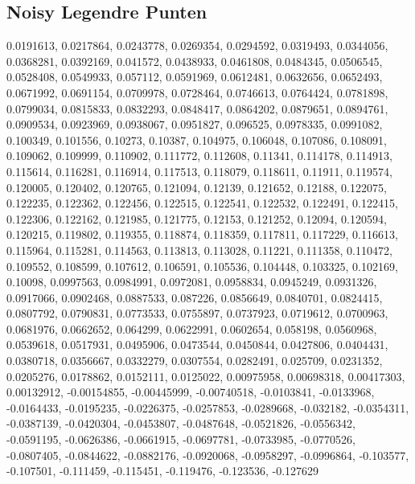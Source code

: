 \documentclass[10pt,a4paper,twocolumn]{article}
\begin{document}
\subsection{Noisy Legendre Punten}
0.0191613, 0.0217864, 0.0243778, 0.0269354, 0.0294592, 0.0319493, 0.0344056, 0.0368281, 0.0392169, 0.041572, 0.0438933, 0.0461808, 0.0484345, 0.0506545, 0.0528408, 0.0549933, 0.057112, 0.0591969, 0.0612481, 0.0632656, 0.0652493, 0.0671992, 0.0691154, 0.0709978, 0.0728464, 0.0746613, 0.0764424, 0.0781898, 0.0799034, 0.0815833, 0.0832293, 0.0848417, 0.0864202, 0.0879651, 0.0894761, 0.0909534, 0.0923969, 0.0938067, 0.0951827, 0.096525, 0.0978335, 0.0991082, 0.100349, 0.101556, 0.10273, 0.10387, 0.104975, 0.106048, 0.107086, 0.108091, 0.109062, 0.109999, 0.110902, 0.111772, 0.112608, 0.11341, 0.114178, 0.114913, 0.115614, 0.116281, 0.116914, 0.117513, 0.118079, 0.118611, 0.11911, 0.119574, 0.120005, 0.120402, 0.120765, 0.121094, 0.12139, 0.121652, 0.12188, 0.122075, 0.122235, 0.122362, 0.122456, 0.122515, 0.122541, 0.122532, 0.122491, 0.122415, 0.122306, 0.122162, 0.121985, 0.121775, 0.12153, 0.121252, 0.12094, 0.120594, 0.120215, 0.119802, 0.119355, 0.118874, 0.118359, 0.117811, 0.117229, 0.116613, 0.115964, 0.115281, 0.114563, 0.113813, 0.113028, 0.11221, 0.111358, 0.110472, 0.109552, 0.108599, 0.107612, 0.106591, 0.105536, 0.104448, 0.103325, 0.102169, 0.10098, 0.0997563, 0.0984991, 0.0972081, 0.0958834, 0.0945249, 0.0931326, 0.0917066, 0.0902468, 0.0887533, 0.087226, 0.0856649, 0.0840701, 0.0824415, 0.0807792, 0.0790831, 0.0773533, 0.0755897, 0.0737923, 0.0719612, 0.0700963, 0.0681976, 0.0662652, 0.064299, 0.0622991, 0.0602654, 0.058198, 0.0560968, 0.0539618, 0.0517931, 0.0495906, 0.0473544, 0.0450844, 0.0427806, 0.0404431, 0.0380718, 0.0356667, 0.0332279, 0.0307554, 0.0282491, 0.025709, 0.0231352, 0.0205276, 0.0178862, 0.0152111, 0.0125022, 0.00975958, 0.00698318, 0.00417303, 0.00132912, -0.00154855, -0.00445999, -0.00740518, -0.0103841, -0.0133968, -0.0164433, -0.0195235, -0.0226375, -0.0257853, -0.0289668, -0.032182, -0.0354311, -0.0387139, -0.0420304, -0.0453807, -0.0487648, -0.0521826, -0.0556342, -0.0591195, -0.0626386, -0.0661915, -0.0697781, -0.0733985, -0.0770526, -0.0807405, -0.0844622, -0.0882176, -0.0920068, -0.0958297, -0.0996864, -0.103577, -0.107501, -0.111459, -0.115451, -0.119476, -0.123536, -0.127629
\end{document}
